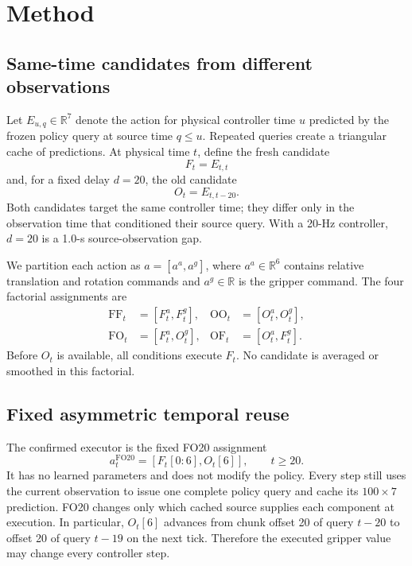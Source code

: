 \section{Method}
\label{sec:method}

\subsection{Same-time candidates from different observations}

Let $E_{u,q}\in\mathbb{R}^{7}$ denote the action for physical controller time
$u$ predicted by the frozen policy query at source time $q\leq u$. Repeated
queries create a triangular cache of predictions. At physical time $t$, define
the fresh candidate
\begin{equation}
    F_t = E_{t,t}
\end{equation}
and, for a fixed delay $d=20$, the old candidate
\begin{equation}
    O_t = E_{t,t-20}.
\end{equation}
Both candidates target the same controller time; they differ only in the
observation time that conditioned their source query. With a 20-Hz controller,
$d=20$ is a 1.0-s source-observation gap.

We partition each action as $a=[a^{a},a^{g}]$, where $a^{a}\in\mathbb{R}^{6}$
contains relative translation and rotation commands and $a^{g}\in\mathbb{R}$
is the gripper command. The four factorial assignments are
\begin{align}
    \mathrm{FF}_t &= [F_t^{a},F_t^{g}], &
    \mathrm{OO}_t &= [O_t^{a},O_t^{g}], \\
    \mathrm{FO}_t &= [F_t^{a},O_t^{g}], &
    \mathrm{OF}_t &= [O_t^{a},F_t^{g}].
\end{align}
Before $O_t$ is available, all conditions execute $F_t$. No candidate is
averaged or smoothed in this factorial.

\subsection{Fixed asymmetric temporal reuse}

The confirmed executor is the fixed FO20 assignment
\begin{equation}
    a_t^{\mathrm{FO20}}=[F_t[0{:}6],O_t[6]], \qquad t\geq20.
    \label{eq:fo20}
\end{equation}
It has no learned parameters and does not modify the policy. Every step still
uses the current observation to issue one complete policy query and cache its
$100\!\times\!7$ prediction. FO20 changes only which cached source supplies
each component at execution. In particular, $O_t[6]$ advances from chunk
offset 20 of query $t-20$ to offset 20 of query $t-19$ on the next tick.
Therefore the executed gripper value may change every controller step.

